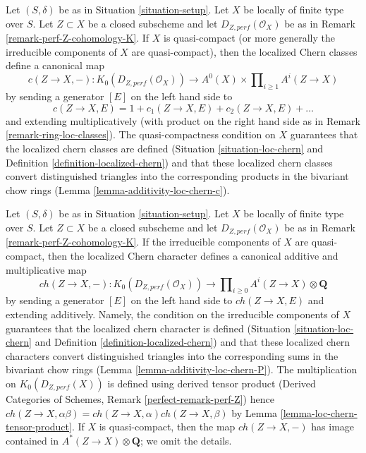 \begin{remark}
\label{remark-localized-chern-classes-K}
Let $(S, \delta)$ be as in Situation \ref{situation-setup}.
Let $X$ be locally of finite type over $S$.
Let $Z \subset X$ be a closed subscheme and let
$D_{Z, perf}(\mathcal{O}_X)$ be as in
Remark \ref{remark-perf-Z-cohomology-K}.
If $X$ is quasi-compact (or more generally the irreducible
components of $X$ are quasi-compact), then
the localized Chern classes define a canonical map
$$
c(Z \to X, -) : K_0(D_{Z, perf}(\mathcal{O}_X)) \longrightarrow
A^0(X) \times \prod\nolimits_{i \geq 1} A^i(Z \to X)
$$
by sending a generator $[E]$ on the left hand side to
$$
c(Z \to X, E) = 1 + c_1(Z \to X, E) + c_2(Z \to X, E) + \ldots
$$
and extending multiplicatively (with product on the right hand
side as in Remark \ref{remark-ring-loc-classes}).
The quasi-compactness condition on $X$ guarantees that the
localized chern classes are defined (Situation \ref{situation-loc-chern} and
Definition \ref{definition-localized-chern})
and that these localized chern classes convert distinguished triangles into
the corresponding products in the bivariant chow rings
(Lemma \ref{lemma-additivity-loc-chern-c}).
\end{remark}

\begin{remark}
\label{remark-localized-chern-character-K}
Let $(S, \delta)$ be as in Situation \ref{situation-setup}.
Let $X$ be locally of finite type over $S$.
Let $Z \subset X$ be a closed subscheme and let
$D_{Z, perf}(\mathcal{O}_X)$ be as in
Remark \ref{remark-perf-Z-cohomology-K}.
If the irreducible components of $X$ are quasi-compact, then
the localized Chern character defines a canonical additive
and multiplicative map
$$
ch(Z \to X, -) : K_0(D_{Z, perf}(\mathcal{O}_X)) \longrightarrow
\prod\nolimits_{i \geq 0} A^i(Z \to X) \otimes \mathbf{Q}
$$
by sending a generator $[E]$ on the left hand side to
$ch(Z \to X, E)$ and extending additively.
Namely, the condition on the irreducible components of $X$ guarantees that the
localized chern character is defined (Situation \ref{situation-loc-chern} and
Definition \ref{definition-localized-chern})
and that these localized chern characters
convert distinguished triangles into the corresponding
sums in the bivariant chow rings
(Lemma \ref{lemma-additivity-loc-chern-P}).
The multiplication on
$K_0(D_{Z, perf}(X))$ is defined using derived tensor product
(Derived Categories of Schemes, Remark \ref{perfect-remark-perf-Z})
hence $ch(Z \to X, \alpha \beta) = ch(Z \to X, \alpha) ch(Z \to X, \beta)$ by
Lemma \ref{lemma-loc-chern-tensor-product}.
If $X$ is quasi-compact, then the map $ch(Z \to X, -)$ has
image contained in $A^*(Z \to X) \otimes \mathbf{Q}$; we omit
the details.
\end{remark}

